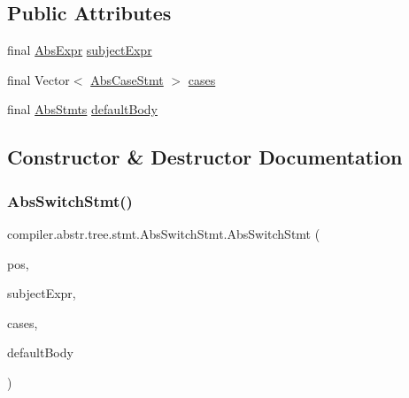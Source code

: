 \subsection*{Public Attributes}
\begin{DoxyCompactItemize}
\item 
final \hyperlink{classcompiler_1_1abstr_1_1tree_1_1expr_1_1_abs_expr}{Abs\+Expr} \hyperlink{classcompiler_1_1abstr_1_1tree_1_1stmt_1_1_abs_switch_stmt_a827d963b0b450513c19919645d325a81}{subject\+Expr}
\item 
final Vector$<$ \hyperlink{classcompiler_1_1abstr_1_1tree_1_1stmt_1_1_abs_case_stmt}{Abs\+Case\+Stmt} $>$ \hyperlink{classcompiler_1_1abstr_1_1tree_1_1stmt_1_1_abs_switch_stmt_a471b6f000fe299a92e2135f1a3921f12}{cases}
\item 
final \hyperlink{classcompiler_1_1abstr_1_1tree_1_1_abs_stmts}{Abs\+Stmts} \hyperlink{classcompiler_1_1abstr_1_1tree_1_1stmt_1_1_abs_switch_stmt_a2a8600e70568fe111d8a3e53a31a3516}{default\+Body}
\end{DoxyCompactItemize}


\subsection{Constructor \& Destructor Documentation}
\mbox{\label{classcompiler_1_1abstr_1_1tree_1_1stmt_1_1_abs_switch_stmt_a467cbc851d97d21688f1378d7d8e13e6}} 
\subsubsection{\texorpdfstring{Abs\+Switch\+Stmt()}{AbsSwitchStmt()}}
{\footnotesize\ttfamily compiler.\+abstr.\+tree.\+stmt.\+Abs\+Switch\+Stmt.\+Abs\+Switch\+Stmt (\begin{DoxyParamCaption}\item[{\hyperlink{classcompiler_1_1_position}{Position}}]{pos,  }\item[{\hyperlink{classcompiler_1_1abstr_1_1tree_1_1expr_1_1_abs_expr}{Abs\+Expr}}]{subject\+Expr,  }\item[{Vector$<$ \hyperlink{classcompiler_1_1abstr_1_1tree_1_1stmt_1_1_abs_case_stmt}{Abs\+Case\+Stmt} $>$}]{cases,  }\item[{\hyperlink{classcompiler_1_1abstr_1_1tree_1_1_abs_stmts}{Abs\+Stmts}}]{default\+Body }\end{DoxyParamCaption})}


